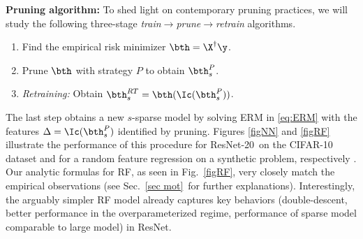 \noindent\textbf{Pruning algorithm:} To shed light on contemporary pruning practices, we will study the following three-stage {\em{train$\rightarrow$prune$\rightarrow$retrain}} algorithms.
\begin{enumerate}
\item Find the empirical risk minimizer $\bth=\X^\dagger \y$.
\item Prune $\bth$ with strategy $P$ to obtain $\bth^P_s$.
\item {\em{Retraining:}} Obtain $\bth^{RT}_s=\bth(\Ic(\bth^P_s))$.
\end{enumerate}
The last step obtains a new $s$-sparse model by solving ERM in \eqref{eq:ERM} with the features $\Delta=\Ic(\bth^P_s)$ identified by pruning. Figures \ref{figNN} and \ref{figRF} illustrate the performance of this procedure for ResNet-20~on the CIFAR-10 dataset and for a random feature regression on a synthetic problem, respectively . Our analytic formulas for RF, as seen in Fig.~\ref{figRF}, very closely match the empirical observations (see Sec.~\ref{sec mot}~for further explanations). Interestingly, the arguably simpler RF model already captures key behaviors (double-descent, better performance in the overparameterized regime, performance of sparse model comparable to large model) in ResNet.






